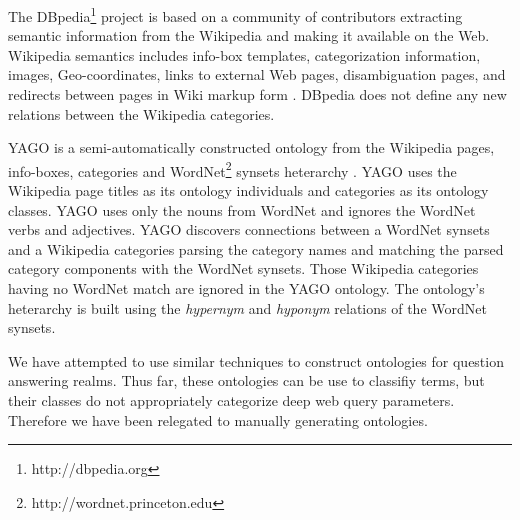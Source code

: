 
The DBpedia\footnote{http://dbpedia.org} project is based on a community of contributors extracting semantic information from the Wikipedia and making it available on the Web.  Wikipedia semantics includes info-box templates, categorization information,  images, Geo-coordinates, links to external Web pages, disambiguation pages, and redirects between pages in Wiki markup form \cite{Bizer2009}.  DBpedia does not define any new relations between the Wikipedia categories.  


YAGO is a semi-automatically constructed ontology from the Wikipedia pages, info-boxes, categories and WordNet\footnote{http://wordnet.princeton.edu} synsets heterarchy \cite{Suchanek2009phd}. YAGO uses the Wikipedia page titles as its ontology individuals and categories as its ontology classes. YAGO uses only the nouns from WordNet and ignores the WordNet verbs and adjectives.  YAGO discovers connections between a WordNet synsets and a Wikipedia categories parsing the category names and matching the parsed category components with the WordNet synsets. Those Wikipedia categories having no WordNet match are ignored in the YAGO ontology.  The ontology's heterarchy is built using the \textit{hypernym} and \textit{hyponym} relations of the WordNet synsets.  

We have attempted to use similar techniques to construct ontologies for question answering realms.  Thus far, these ontologies can be use to classifiy terms, but their classes do not appropriately categorize deep web query parameters. Therefore we have been relegated to manually generating ontologies.  %
 


